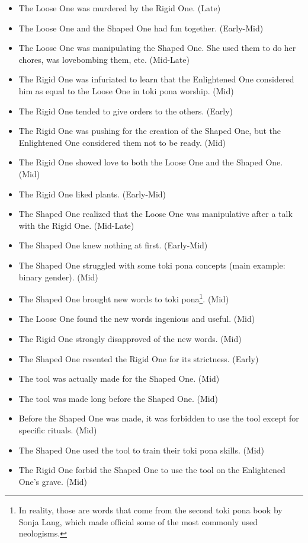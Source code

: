 \documentclass{scrartcl}
\begin{document}
\begin{itemize}
\begin{itemize}
\begin{itemize}
							\item The Loose One was murdered by the Rigid One. (Late)
							\item The Loose One and the Shaped One had fun together. (Early-Mid)
							\item The Loose One was manipulating the Shaped One. She used them to do her chores, was lovebombing them, etc. (Mid-Late)
							\item The Rigid One was infuriated to learn that the Enlightened One considered him as equal to the Loose One in toki pona worship. (Mid)
							\item The Rigid One tended to give orders to the others. (Early)
							\item The Rigid One was pushing for the creation of the Shaped One, but the Enlightened One considered them not to be ready. (Mid)
							\item The Rigid One showed love to both the Loose One and the Shaped One. (Mid)
							\item The Rigid One liked plants. (Early-Mid)
							\item The Shaped One realized that the Loose One was manipulative after a talk with the Rigid One. (Mid-Late)
							\item The Shaped One knew nothing at first. (Early-Mid)
							\item The Shaped One struggled with some toki pona concepts (main example: binary gender). (Mid)
							\item The Shaped One brought new words to toki pona\footnote{In reality, those are words that come from the second toki pona book by Sonja Lang, which made official some of the most commonly used neologisms.}. (Mid)
							\item The Loose One found the new words ingenious and useful. (Mid)
							\item The Rigid One strongly disapproved of the new words. (Mid)
							\item The Shaped One resented the Rigid One for its strictness. (Early)
							\item The tool was actually made for the Shaped One. (Mid)
							\item The tool was made long before the Shaped One. (Mid)
							\item Before the Shaped One was made, it was forbidden to use the tool except for specific rituals. (Mid)
							\item The Shaped One used the tool to train their toki pona skills. (Mid)
							\item The Rigid One forbid the Shaped One to use the tool on the Enlightened One's grave. (Mid)

\end{itemize}
\end{itemize}
\end{itemize}
\end{document}
